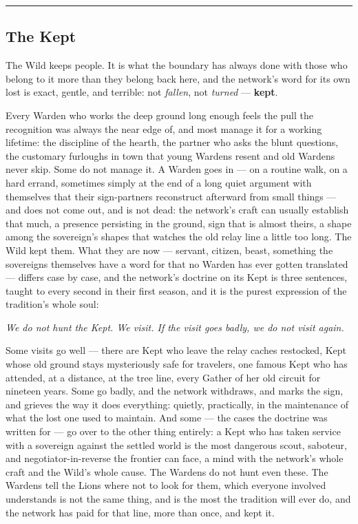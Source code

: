 \medskip\hrule\medskip

\subsection{The Kept}

The Wild keeps people. It is what the boundary has always done with those who belong to it more than they belong back here, and the network's word for its own lost is exact, gentle, and terrible: not \textit{fallen}, not \textit{turned} --- \textbf{kept}.

Every Warden who works the deep ground long enough feels the pull the recognition was always the near edge of, and most manage it for a working lifetime: the discipline of the hearth, the partner who asks the blunt questions, the customary furloughs in town that young Wardens resent and old Wardens never skip. Some do not manage it. A Warden goes in --- on a routine walk, on a hard errand, sometimes simply at the end of a long quiet argument with themselves that their sign-partners reconstruct afterward from small things --- and does not come out, and is not dead: the network's craft can usually establish that much, a presence persisting in the ground, sign that is almost theirs, a shape among the sovereign's shapes that watches the old relay line a little too long. The Wild kept them. What they are now --- servant, citizen, beast, something the sovereigns themselves have a word for that no Warden has ever gotten translated --- differs case by case, and the network's doctrine on its Kept is three sentences, taught to every second in their first season, and it is the purest expression of the tradition's whole soul:

\textit{We do not hunt the Kept. We visit. If the visit goes badly, we do not visit again.}

Some visits go well --- there are Kept who leave the relay caches restocked, Kept whose old ground stays mysteriously safe for travelers, one famous Kept who has attended, at a distance, at the tree line, every Gather of her old circuit for nineteen years. Some go badly, and the network withdraws, and marks the sign, and grieves the way it does everything: quietly, practically, in the maintenance of what the lost one used to maintain. And some --- the cases the doctrine was written for --- go over to the other thing entirely: a Kept who has taken service with a sovereign against the settled world is the most dangerous scout, saboteur, and negotiator-in-reverse the frontier can face, a mind with the network's whole craft and the Wild's whole cause. The Wardens do not hunt even these. The Wardens tell the Lions where not to look for them, which everyone involved understands is not the same thing, and is the most the tradition will ever do, and the network has paid for that line, more than once, and kept it.

